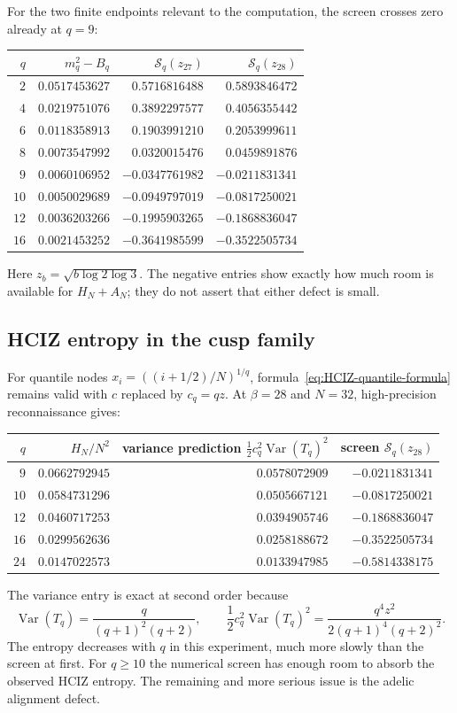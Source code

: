 \documentclass[11pt]{article}
\newcommand{\Var}{\operatorname{Var}}
\newcommand{\1}{\mathbf 1}
\theoremstyle{plain}
\theoremstyle{definition}
\theoremstyle{remark}
\begin{document}
For the two finite endpoints relevant to the computation, the screen crosses
zero already at $q=9$:
\begin{center}
\begin{tabular}{@{}rrrr@{}}
\toprule
$q$ & $m_q^2-B_q$ & $\mathscr S_q(z_{27})$ & $\mathscr S_q(z_{28})$\\
\midrule
$2$  & $0.0517453627$ & $ 0.5716816488$ & $ 0.5893846472$\\
$4$  & $0.0219751076$ & $ 0.3892297577$ & $ 0.4056355442$\\
$6$  & $0.0118358913$ & $ 0.1903991210$ & $ 0.2053999611$\\
$8$  & $0.0073547992$ & $ 0.0320015476$ & $ 0.0459891876$\\
$9$  & $0.0060106952$ & $-0.0347761982$ & $-0.0211831341$\\
$10$ & $0.0050029689$ & $-0.0949797019$ & $-0.0817250021$\\
$12$ & $0.0036203266$ & $-0.1995903265$ & $-0.1868836047$\\
$16$ & $0.0021453252$ & $-0.3641985599$ & $-0.3522505734$\\
\bottomrule
\end{tabular}
\end{center}
Here $z_b=\sqrt{b\log2\log3}$.  The negative entries show exactly how much
room is available for $H_N+A_N$; they do not assert that either defect is
small.

\subsection{HCIZ entropy in the cusp family}

For quantile nodes
$x_i=((i+1/2)/N)^{1/q}$, formula~\eqref{eq:HCIZ-quantile-formula} remains valid
with $c$ replaced by $c_q=qz$.  At $\beta=28$ and $N=32$, high-precision
reconnaissance gives:
\begin{center}
\begin{tabular}{@{}rrrr@{}}
\toprule
$q$ & $H_N/N^2$ & variance prediction
$\frac12c_q^2\Var(T_q)^2$ & screen $\mathscr S_q(z_{28})$\\
\midrule
$9$  & $0.0662792945$ & $0.0578072909$ & $-0.0211831341$\\
$10$ & $0.0584731296$ & $0.0505667121$ & $-0.0817250021$\\
$12$ & $0.0460717253$ & $0.0394905746$ & $-0.1868836047$\\
$16$ & $0.0299562636$ & $0.0258188672$ & $-0.3522505734$\\
$24$ & $0.0147022573$ & $0.0133947985$ & $-0.5814338175$\\
\bottomrule
\end{tabular}
\end{center}
The variance entry is exact at second order because
\begin{equation}\label{eq:cusp-variance}
 \Var(T_q)=\frac{q}{(q+1)^2(q+2)},
 \qquad
 \frac12c_q^2\Var(T_q)^2
 =\frac{q^4z^2}{2(q+1)^4(q+2)^2}.
\end{equation}
The entropy decreases with $q$ in this experiment, much more slowly than the
screen at first.  For $q\ge10$ the numerical screen has enough room to absorb
the observed HCIZ entropy.  The remaining and more serious issue is the
adelic alignment defect.
\end{document}
